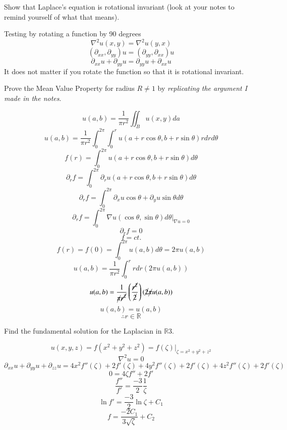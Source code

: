 \documentclass[12pt]{exam}
\newcommand{\R}{\mathbb{R}}
\newcommand{\grad}{\nabla}
\newcommand{\px}{\partial_x}
\newcommand{\py}{\partial_y}
\newcommand{\pxx}{\partial_{xx}}
\newcommand{\pyy}{\partial_{yy}}
\begin{document}
\newpage 
\begin{questions}
\begin{question}
Show that Laplace's equation is rotational invariant (look at your notes to remind yourself of what that means). 
\end{question}
\begin{solutionorbox}[\stretch{1}]
Testing by rotating a function by 90 degrees
\[\grad^2 u(x,y) = \grad^2 u(y,x)\]
\[(\pxx,\pyy)u = (\pyy,\pxx)u\]
\[\pxx u + \pyy u = \pyy u + \pxx u\]
It does not matter if you rotate the function so that it is rotational invariant.
\end{solutionorbox}


\newpage 
\begin{question}
Prove the Mean Value Property for radius $R\neq 1$ by \textit{replicating the argument I made in the notes}. 
\end{question}
\begin{solutionorbox}[\stretch{1}]
\[u(a,b) = \frac{1}{\pi r^2}\iint_B u(x,y) da\]
\[u(a,b) = \frac{1}{\pi r^2}\int_0^{2\pi} \int_0^r u(a+r\cos\theta,b+r\sin\theta) rdrd\theta\]
\[f(r) = \int_0^{2\pi}u(a+r\cos\theta,b+r\sin\theta)d\theta\]
\[\partial_r f = \int_0^{2\pi}\partial_r u(a+r\cos\theta,b+r\sin\theta)d\theta\]
\[\partial_r f = \int_0^{2\pi} \px u\cos\theta + \py u \sin\theta d\theta\]
\[\partial_r f = \int_0^{2\pi} \grad u(\cos\theta,\sin\theta) d\theta|_{\grad u = 0}\]
\[\partial_r f = 0\]
\[f = ct.\]
\[f(r) = f(0) = \int_0^{2\pi} u(a,b) d\theta = 2\pi u(a,b)\]
\[u(a,b) = \frac{1}{\pi r^2} \int_0^r r dr (2\pi u(a,b))\]
\[u(a,b) = \frac{1}{\cancel{\pi} \cancel{r^2}}\left(\frac{\cancel{r^2}}{\cancel{2}}\right)(\cancel{2}\cancel{\pi} u(a,b))\]
\[u(a,b) = u(a,b)\]
\[\therefore r \in \R\]
\end{solutionorbox}


\newpage 
\begin{question}
Find the fundamental solution for the Laplacian in $\R{3}$. 
\end{question}
\begin{solutionorbox}[\stretch{1}]
\[u(x,y,z) = f(x^2+y^2+z^2) = f(\zeta)|_{\zeta = x^2+y^2+z^2}\]
\[\grad^2 u = 0\]
\[\pxx u + \pyy u + \partial_{zz} u = 4x^2 f''(\zeta) + 2f'(\zeta) + 4y^2 f''(\zeta) + 2f'(\zeta) + 4z^2 f''(\zeta) + 2f'(\zeta)\]
\[0 = 4 \zeta f'' +2 f'\]
\[\frac{f''}{f'} = \frac{-3}{2} \frac{1}{\zeta}\]
\[\ln{f'} = \frac{-3}{2} \ln{\zeta} + C_1\]
\[f = \frac{-2 C_1}{3 \sqrt{\zeta}} + C_2\]
\end{solutionorbox}


\end{questions}
\end{document}
